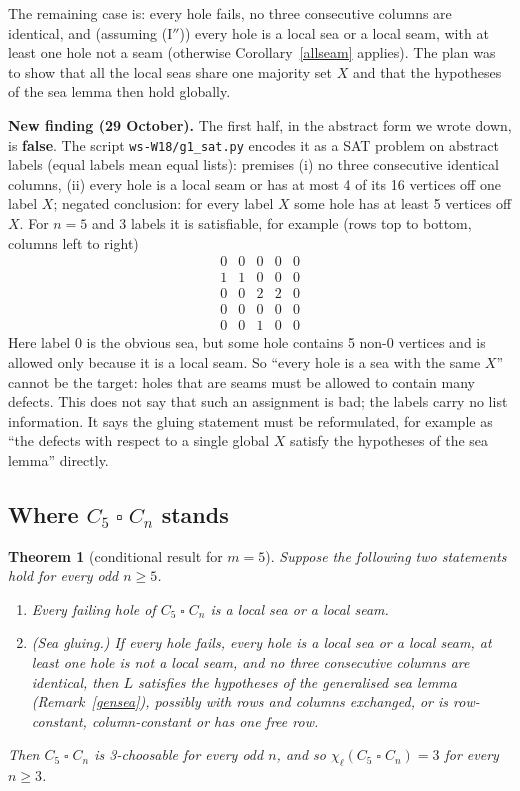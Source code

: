 \documentclass[11pt]{article}
\theoremstyle{plain}
\newtheorem{theorem}{Theorem}[section]
\theoremstyle{definition}
\theoremstyle{remark}
\newcommand{\T}{\mathbin{\square}}
\newcommand{\script}[1]{\texttt{#1}}
\begin{document}
The remaining case is: every hole fails, no three consecutive columns are identical, and (assuming (I$''$)) every hole is a
local sea or a local seam, with at least one hole not a seam (otherwise Corollary~\ref{allseam} applies). The plan was to show
that all the local seas share one majority set $X$ and that the hypotheses of the sea lemma then hold globally.

\textbf{New finding (29 October).} The first half, in the abstract form we wrote down, is \textbf{false}. The script
\script{ws-W18/g1\_sat.py} encodes it as a SAT problem on abstract labels (equal labels mean equal lists): premises (i) no three
consecutive identical columns, (ii) every hole is a local seam or has at most 4 of its 16 vertices off one label $X$; negated
conclusion: for every label $X$ some hole has at least 5 vertices off $X$. For $n = 5$ and 3 labels it is satisfiable, for
example (rows top to bottom, columns left to right)
\[
\begin{matrix} 0&0&0&0&0\\ 1&1&0&0&0\\ 0&0&2&2&0\\ 0&0&0&0&0\\ 0&0&1&0&0 \end{matrix}
\]
Here label $0$ is the obvious sea, but some hole contains 5 non-$0$ vertices and is allowed only because it is a local seam.
So ``every hole is a sea with the same $X$'' cannot be the target: holes that are seams must be allowed to contain many
defects. This does not say that such an assignment is bad; the labels carry no list information. It says the gluing statement
must be reformulated, for example as ``the defects with respect to a single global $X$ satisfy the hypotheses of the sea lemma''
directly.

\subsection{Where $C_5 \T C_n$ stands}

\begin{theorem}[conditional result for $m = 5$]\label{conditional}
Suppose the following two statements hold for every odd $n \ge 5$.
\begin{enumerate}[label=(\Roman*),nosep]
\item Every failing hole of $C_5 \T C_n$ is a local sea or a local seam.
\item (Sea gluing.) If every hole fails, every hole is a local sea or a local seam, at least one hole is not a local seam, and
no three consecutive columns are identical, then $L$ satisfies the hypotheses of the generalised sea lemma
(Remark~\ref{gensea}), possibly with rows and columns exchanged, or is row-constant, column-constant or has one free row.
\end{enumerate}
Then $C_5 \T C_n$ is 3-choosable for every odd $n$, and so $\chi_\ell(C_5 \T C_n) = 3$ for every $n \ge 3$.
\end{theorem}
\end{document}
